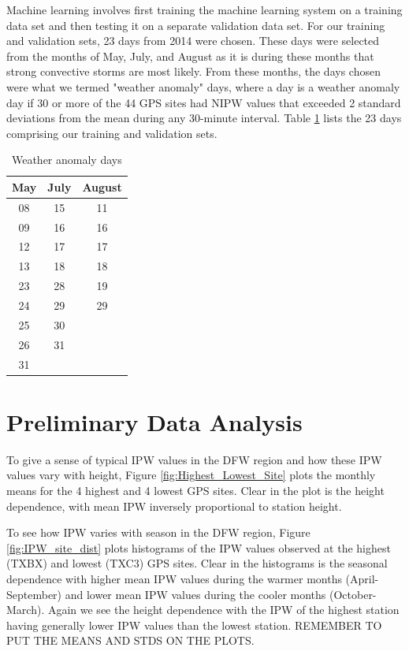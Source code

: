 \documentclass[proposal]{umassthesis}
\begin{document}
{Machine learning involves first training the machine learning system on a training data set and then testing it on a separate validation data set. For our training and validation sets, 23 days from 2014 were chosen. These days were selected from the months of May, July, and August as it is during these months that strong convective storms are most likely. From these months, the days chosen were what we termed "weather anomaly" days, where a day is a weather anomaly day if 30 or more of the 44 GPS sites had NIPW values that exceeded 2 standard deviations from the mean during any 30-minute interval. Table \ref{table:weather anomaly} lists the 23 days comprising our training and validation sets.

\begin{table}
\begin{center}
\caption{Weather anomaly days}
\begin{tabular}{ |c|c|c| } 
 \hline
 May & July & August  \\ 
 \hline
 08 & 15 & 11 \\ 
 09 & 16 & 16 \\
 12 & 17 & 17 \\
 13 & 18 & 18 \\
 23 & 28 & 19 \\
 24 & 29 & 29 \\
 25 & 30 &      \\
 26 & 31 &      \\
 31 &     &       \\
\hline
\end{tabular}
\label{table:weather anomaly}
\end{center}
\end{table}

\section{Preliminary Data Analysis}

To give a sense of typical IPW values in the DFW region and how these IPW values vary with height, Figure \ref{fig:Highest_Lowest_Site} plots the monthly means for the 4 highest and 4 lowest GPS sites. Clear in the plot is the height dependence, with mean IPW inversely proportional to station height.

To see how IPW varies with season in the DFW region, Figure \ref{fig:IPW_site_dist} plots histograms of the IPW values observed at the highest (TXBX) and lowest (TXC3) GPS sites. Clear in the histograms is the seasonal dependence with higher mean IPW values during the warmer months (April-September) and lower mean IPW values during the cooler months (October-March). Again we see the height dependence with the IPW of the highest station having generally lower IPW values than the lowest station. REMEMBER TO PUT THE MEANS AND STDS ON THE PLOTS.

}
\end{document}
